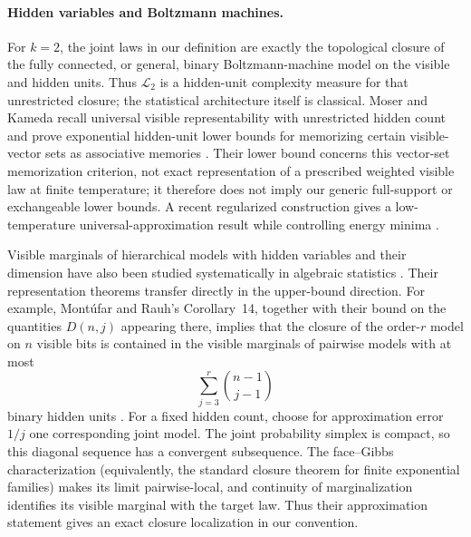 \documentclass{article}
\newcommand{\LC}{\mathcal{L}}
\begin{document}
\paragraph{Hidden variables and Boltzmann machines.}
For $k=2$, the joint laws in our definition are exactly the topological closure
of the fully connected, or general, binary Boltzmann-machine model on the
visible and hidden units.  Thus $\LC_2$ is a hidden-unit complexity measure for
that unrestricted closure; the statistical architecture itself is classical.
Moser and Kameda recall universal visible representability with unrestricted
hidden count and prove exponential hidden-unit lower bounds for memorizing
certain visible-vector sets as associative memories \cite{moserkameda92}.
Their lower bound concerns this vector-set memorization criterion, not exact
representation of a prescribed weighted visible law at finite temperature; it
therefore does not imply our generic full-support or exchangeable lower bounds.
A recent regularized construction gives a low-temperature
universal-approximation result while controlling energy minima
\cite{grzybowski23}.

Visible marginals of hierarchical models with hidden variables and their
dimension have also been studied systematically in algebraic statistics
\cite{montufarrauh17,montufarmorton17}.  Their representation theorems transfer
directly in the upper-bound direction.  For example,
Mont\'ufar and Rauh's Corollary~14, together with their bound on the quantities
$D(n,j)$ appearing there, implies that the closure of the order-$r$ model on
$n$ visible bits is contained in the visible marginals of pairwise models with
at most
\[
  \sum_{j=3}^r\binom{n-1}{j-1}
\]
binary hidden units \cite[Corollary~14]{montufarrauh17}.  For a fixed hidden
count, choose for approximation error $1/j$ one corresponding joint model.
The joint probability simplex is compact, so this diagonal sequence has a
convergent subsequence.  The face--Gibbs characterization (equivalently, the
standard closure theorem for finite exponential families) makes its limit
pairwise-local, and continuity of marginalization identifies its visible
marginal with the target law.  Thus their approximation statement gives an
exact closure localization in our convention.
\end{document}

